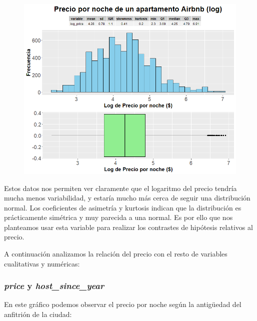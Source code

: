 \documentclass{article}
\begin{document}
\vspace{0.35cm}
\begin{figure}[h]
\hspace*{-0.15cm}
\centering
\includegraphics[scale = 0.6]{grafico_precio_log}
\end{figure}
\vspace{0.15cm}

Estos datos nos permiten ver claramente que el logaritmo del precio tendría mucha menos variabilidad, y estaría mucho más cerca de seguir una distribución normal. Los coeficientes de asimetría y kurtosis indican que la distribución es prácticamente simétrica y muy parecida a una normal. Es por ello que nos planteamos usar esta variable para realizar los contrastes de hipótesis relativos al precio.

\clearpage
A continuación analizamos la relación del precio con el resto de variables cualitativas y numéricas:
\subsubsection{\emph{price} y \emph{host\_since\_year}}

En este gráfico podemos observar el precio por noche según la antigüedad del anfitrión de la ciudad:
\end{document}
